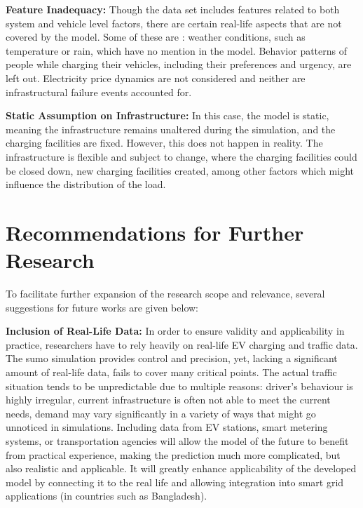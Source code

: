 \documentclass{thesis-library}
\begin{document}
{\vspace{0.5em}
\noindent \textbf{Feature Inadequacy:} Though the data set includes features related to both system and vehicle level factors, there are certain real-life aspects that are not covered by the model. Some of these are : weather conditions, such as temperature or rain, which have no mention in the model. Behavior patterns of people while charging their vehicles, including their preferences and urgency, are left out. Electricity price dynamics are not considered and neither are infrastructural failure events accounted for.

\vspace{0.5em}
\noindent\textbf{Static Assumption on Infrastructure:} In this case, the model is static, meaning the infrastructure remains unaltered during the simulation, and the charging facilities are fixed. However, this does not happen in reality. The infrastructure is flexible and subject to change, where the charging facilities could be closed down, new charging facilities created, among other factors which might influence the distribution of the load.

\section{Recommendations for Further Research}

\noindent To facilitate further expansion of the research scope and relevance, several suggestions for future works are given below:

\vspace{0.5em}
\noindent\textbf{Inclusion of Real-Life Data:} In order to ensure validity and applicability in practice, researchers have to rely heavily on real-life EV charging and traffic data. The \Gls{sumo} simulation provides control and precision, yet, lacking a significant amount of real-life data, fails to cover many critical points. The actual traffic situation tends to be unpredictable due to multiple reasons: driver’s behaviour is highly irregular, current infrastructure is often not able to meet the current needs, demand may vary significantly in a variety of ways that might go unnoticed in simulations. Including data from EV stations, smart metering systems, or transportation agencies will allow the model of the future to benefit from practical experience, making the prediction much more complicated, but also realistic and applicable. It will greatly enhance applicability of the developed model by connecting it to the real life and allowing integration into smart grid applications (in countries such as Bangladesh).

}
\end{document}
